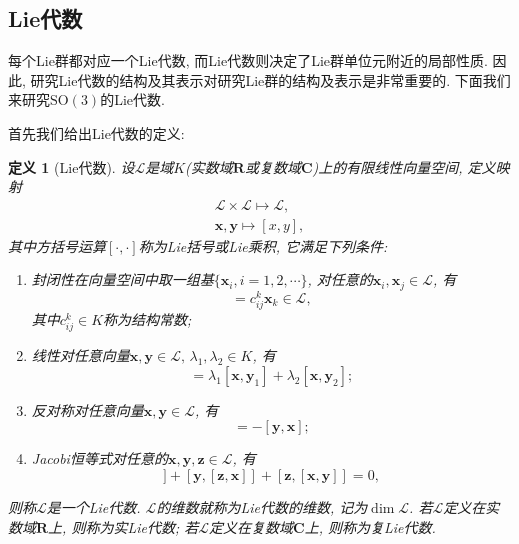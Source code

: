 \documentclass[UTF8]{ctexart}
\newtheorem{define}{定义}
\begin{document}
\subsection{Lie代数}
每个Lie群都对应一个Lie代数, 而Lie代数则决定了Lie群单位元附近的局部性质. 因此, 研究Lie代数的结构及其表示对研究Lie群的结构及表示是非常重要的. 下面我们来研究$\mathrm{SO}(3)$的Lie代数.

首先我们给出Lie代数的定义:
\begin{define}[Lie代数]
  设$\mathcal{L}$是域$K$(实数域$\mathbf{R}$或复数域$\mathbf{C}$)上的有限线性向量空间, 定义映射
  \begin{gather}
    \mathcal{L} \times \mathcal{L} \mapsto \mathcal{L}, \\
    \bm{x}, \bm{y} \mapsto [x,y], 
  \end{gather}
其中方括号运算$[\cdot,\cdot]$称为Lie括号或Lie乘积, 它满足下列条件:
\begin{enumerate}
\item 封闭性\quad 在向量空间中取一组基$\{\bm{x}_i, i = 1, 2, \cdots\}$, 对任意的$\bm{x}_i, \bm{x}_j \in \mathcal{L}$, 有
  \begin{equation}
    [\bm{x}_i, \bm{x}_j] = c_{ij}^{k}\bm{x}_k \in \mathcal{L}, 
  \end{equation}
其中$c_{ij}^k \in K$称为结构常数;
\item 线性\quad 对任意向量$\bm{x},\bm{y} \in \mathcal{L}, \, \lambda_1, \lambda_2 \in K$, 有
  \begin{equation}
    [\bm{x}, \lambda_1\bm{y}_1 + \lambda_1\bm{y}_2] = \lambda_1[\bm{x},\bm{y}_1] + \lambda_2[\bm{x}, \bm{y}_2];
  \end{equation}
\item 反对称\quad 对任意向量$\bm{x},\bm{y} \in \mathcal{L}$, 有
  \begin{equation}
    [\bm{x}, \bm{y}] = -[\bm{y}, \bm{x}];
  \end{equation}
\item Jacobi恒等式\quad 对任意的$\bm{x}, \bm{y}, \bm{z} \in \mathcal{L}$, 有
  \begin{equation}
    [\bm{x},[\bm{y},\bm{z}]] + [\bm{y},[\bm{z},\bm{x}]] + [\bm{z},[\bm{x},\bm{y}]]  = 0,
  \end{equation}
\end{enumerate}
则称$\mathcal{L}$是一个Lie代数. $\mathcal{L}$的维数就称为Lie代数的维数, 记为$\dim \mathcal{L}$. 若$\mathcal{L}$定义在实数域$\mathbf{R}$上, 则称为实Lie代数; 若$\mathcal{L}$定义在复数域$\mathbf{C}$上, 则称为复Lie代数.
\end{define}
\end{document}
